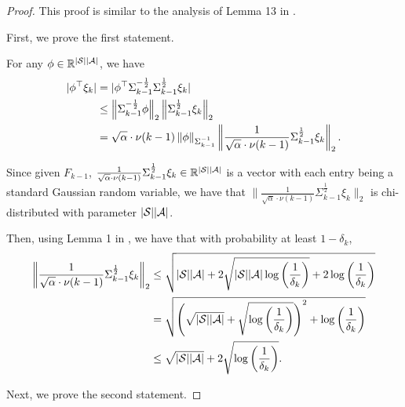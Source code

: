 \begin{proof}
	This proof is similar to the analysis of Lemma 13 in \cite{efroni2021reinforcement}.
	
	First, we prove the first statement.
	
	For any $\phi \in \mathbb{R}^{|\mathcal{S}||\mathcal{A}|}$, we have
	\begin{align}
		|\phi^\top \xi_k| &= |\phi^\top \Sigma_{k-1}^{-\frac{1}{2}} \Sigma_{k-1}^{\frac{1}{2}} \xi_k|
		\nonumber\\
		&\leq \left\|  \Sigma_{k-1}^{-\frac{1}{2}} \phi \right\|_2 \left\| \Sigma_{k-1}^{\frac{1}{2}} \xi_k \right\|_2
		\nonumber\\
		&= \sqrt{\alpha} \cdot \nu(k-1) \left\| \phi \right\|_{\Sigma_{k-1}^{-1}} \left\| \frac{1}{\sqrt{\alpha} \cdot \nu(k-1)} \Sigma_{k-1}^{\frac{1}{2}} \xi_k \right\|_2 . \label{eq:known_tran_phi_xi_decomposition}
	\end{align}
	
	Since given $F_{k-1}$, $\frac{1}{\sqrt{\alpha} \cdot \nu(k-1)} \Sigma_{k-1}^{\frac{1}{2}} \xi_k \in \mathbb{R}^{|\mathcal{S}| |\mathcal{A}|}$ is a vector with each entry being a standard Gaussian random variable, we have that $\|\frac{1}{\sqrt{\alpha} \cdot \nu(k-1)} \Sigma_{k-1}^{\frac{1}{2}} \xi_k\|_2$ is chi-distributed with parameter $|\mathcal{S}| |\mathcal{A}|$. 
	
	Then, using Lemma 1 in \cite{laurent2000adaptive}, we have that with probability at least $1-\delta_k$,
	\begin{align*}
		\left\| \frac{1}{\sqrt{\alpha} \cdot \nu(k-1)} \Sigma_{k-1}^{\frac{1}{2}} \xi_k \right\|_2 &\leq \sqrt{|\mathcal{S}| |\mathcal{A}| + 2\sqrt{|\mathcal{S}| |\mathcal{A}| \log\left( \frac{1}{\delta_k} \right)} + 2 \log\left( \frac{1}{\delta_k} \right) }
		\\
		&= \sqrt{ \left(  \sqrt{|\mathcal{S}| |\mathcal{A}|} + \sqrt{\log\left( \frac{1}{\delta_k} \right)}  \right)^2 +  \log\left( \frac{1}{\delta_k} \right) } 
		\\
		&\leq \sqrt{|\mathcal{S}| |\mathcal{A}|} + 2 \sqrt{\log\left( \frac{1}{\delta_k} \right)} .
	\end{align*}
	
	Next, we prove the second statement.
	

\end{proof}
